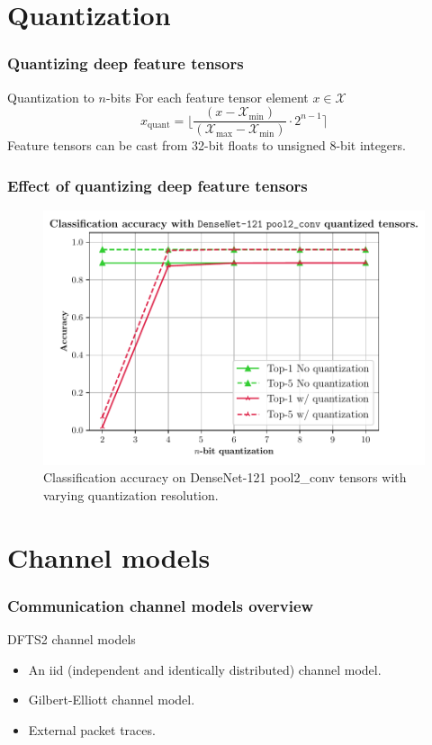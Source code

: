 \documentclass[aspectratio=169]{beamer}
\begin{document}
\section{Quantization}
\begin{frame}
	\frametitle{Quantizing deep feature tensors}
	\begin{block}{Quantization to $n$-bits}
		For each feature tensor element $x \in \mathcal{X}$
		\[
		x_{\text{quant}} = \Bigg \lfloor \frac{(x - \mathcal{X}_{\text{min}})}{( \mathcal{X}_{\text{max}} -  \mathcal{X}_{\text{min}})} \cdot 2^{n-1} \Bigg \rceil
		\]
		Feature tensors can be cast from 32-bit floats to unsigned 8-bit integers.
	\end{block}
\end{frame}

\begin{frame}
\frametitle{Effect of quantizing deep feature tensors}
    \begin{figure}
        \centering
        \includegraphics[scale=0.5]{quant_densenet121_pool2_conv.pdf}
        \caption{Classification accuracy on DenseNet-121 pool2\_conv tensors with varying quantization resolution.}
        \label{fig:quant}
    \end{figure}
\end{frame}

\section{Channel models}
\begin{frame}
\frametitle{Communication channel models overview}
\begin{block}{DFTS2 channel models}
\begin{itemize}
    \item An iid (independent and identically distributed) channel model.
	\item Gilbert-Elliott channel model.
	\item External packet traces.
\end{itemize}
\end{block}
\end{frame}
\end{document}
